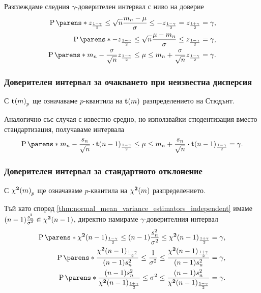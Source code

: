 \documentclass{../../common/topic}
\begin{document}
Разглеждаме следния \( \gamma \)-доверителен интервал с ниво на доверие
\begin{align*}
  \Prob \parens*{ z_{\frac {1-\gamma} 2} \leq \sqrt n \frac {m_n - \mu} \sigma \leq -z_{\frac {1-\gamma} 2} = z_{\frac {1+\gamma} 2} } &= \gamma,
  \\
  \Prob \parens*{ -z_{\frac {1-\gamma} 2} \leq \sqrt n \frac {\mu - m_n} \sigma \leq z_{\frac {1-\gamma} 2} } &= \gamma,
  \\
  \Prob \parens*{ m_n - \frac \sigma {\sqrt n} z_{\frac {1-\gamma} 2} \leq \mu \leq m_n + \frac \sigma {\sqrt n} z_{\frac {1-\gamma} 2} } &= \gamma.
\end{align*}

\subsubsection{Доверителен интервал за очакването при неизвестна дисперсия}

С \( {\operatorname{\mathbf{t}}(m)}_p \) ще означаваме \( p \)-квантила на \( \operatorname{\mathbf{t}}(m) \) разпределението на Стюдънт.

Аналогично със случая с известно средно, но използвайки стюдентизация вместо стандартизация, получаваме интервала
\begin{equation*}
  \Prob \parens*{ m_n - \frac {s_n} {\sqrt n} \cdot {\distr{t}(n-1)}_{\frac {1-\gamma} 2} \leq \mu \leq m_n + \frac {s_n} {\sqrt n} \cdot {\distr{t}(n-1)}_{\frac {1-\gamma} 2} } = \gamma.
\end{equation*}

\subsubsection{Доверителен интервал за стандартното отклонение}

С \( {\operatorname{\mathbf{\chi^2}}(m)}_p \) ще означаваме \( p \)-квантила на \( \operatorname{\mathbf{\chi^2}}(m) \) разпределението.

Тъй като според \cref{thm:normal_mean_variance_estimators_independent} имаме \( (n-1) \frac {s_n^2} {\sigma^2} \in \operatorname{\mathbf{\chi^2}}(n-1) \), директно намираме \( \gamma \)-доверителния интервал
\begin{align*}
  \Prob \parens*{ {\distr{\chi^2}(n-1)}_{\frac {1-\gamma} 2} \leq (n-1) \frac {s_n^2} {\sigma^2} \leq {\distr{\chi^2}(n-1)}_{\frac {1+\gamma} 2} } &= \gamma,
  \\
  \Prob \parens*{ \frac {{\distr{\chi^2}(n-1)}_{\frac {1-\gamma} 2}} {(n-1) s_n^2} \leq \frac 1 {\sigma^2} \leq \frac {{\distr{\chi^2}(n-1)}_{\frac {1+\gamma} 2}} {(n-1) s_n^2} } &= \gamma,
  \\
  \Prob \parens*{ \frac {(n-1) s_n^2} {{\distr{\chi^2}(n-1)}_{\frac {1+\gamma} 2}} \leq \sigma^2 \leq \frac {(n-1) s_n^2} {{\distr{\chi^2}(n-1)}_{\frac {1-\gamma} 2}} } &= \gamma.
\end{align*}

\printbibliography
\end{document}
